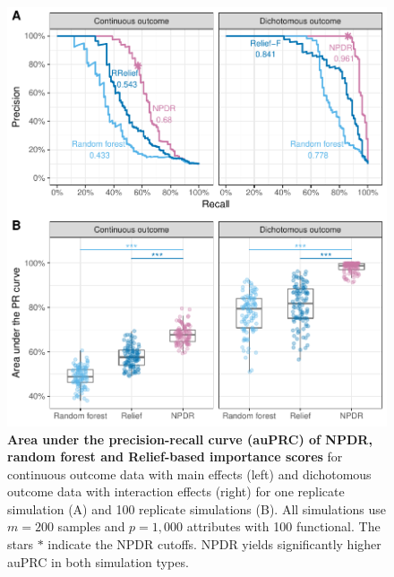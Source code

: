 \documentclass[10pt]{article}
\begin{document}
\begin{figure}[!tbp]
\centerline{\includegraphics[trim = 0 0 0 0]{../figs/fig2_pr_plots.pdf}}
\caption{{\bf Area under the precision-recall curve (auPRC) of NPDR, random forest and Relief-based importance scores} for continuous outcome data with main effects (left) and dichotomous outcome data with interaction effects (right) for one replicate simulation (A) and 100 replicate simulations (B). All simulations use $m = 200$ samples and $p = 1,000$ attributes with 100 functional. The stars $\ast$ indicate the NPDR cutoffs. NPDR yields significantly higher auPRC in both simulation types.}
\label{fig:pr_curve}
\end{figure}
\end{document}
